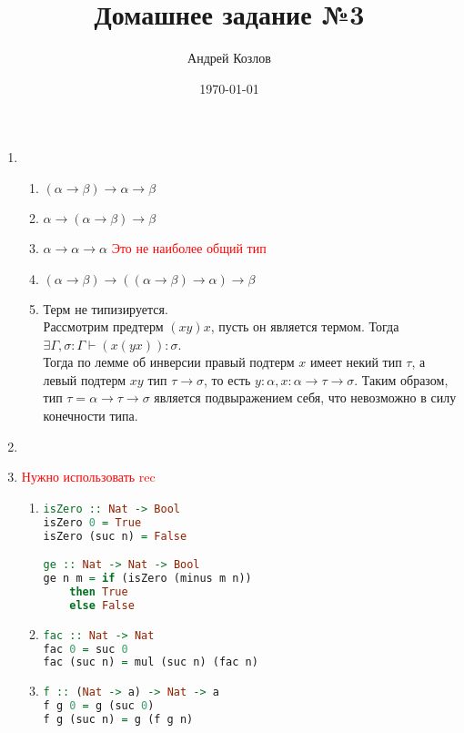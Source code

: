 \documentclass[12pt,a4paper]{article}
\begin{document}
\title{Домашнее задание №3}
\author{Андрей Козлов}
\date{\today}

\maketitle

\begin{enumerate}
\item {
	\begin{enumerate}
		\item $(\alpha \rightarrow \beta) \rightarrow \alpha \rightarrow \beta$
		\item $\alpha \rightarrow (\alpha \rightarrow \beta) \rightarrow \beta$
		\item $\alpha \rightarrow \alpha \rightarrow \alpha$
            \textcolor{red}{Это не наиболее общий тип}
		\item $(\alpha \rightarrow \beta) \rightarrow ((\alpha \rightarrow \beta) \rightarrow \alpha) \rightarrow \beta$
		\item {
			Терм не типизируется.\\
			Рассмотрим предтерм $(x y) x$, пусть он является термом. Тогда $\exists \Gamma, \sigma \colon \Gamma \vdash (x (y x)) \colon \sigma$.\\
			Тогда по лемме об инверсии правый подтерм $x$ имеет некий тип $\tau$, а левый подтерм $x y$ тип $\tau \rightarrow \sigma$, то есть $y \colon \alpha, x \colon \alpha \rightarrow \tau \rightarrow \sigma$. Таким образом, тип $\tau =  \alpha \rightarrow \tau \rightarrow \sigma$ является подвыражением себя, что невозможно в силу конечности типа.
		}
	\end{enumerate}
}
\item
\item
\textcolor{red}{Нужно использовать rec}
{
	\begin{enumerate}
		\item {
			\begin{lstlisting}[language=Haskell]
isZero :: Nat -> Bool
isZero 0 = True
isZero (suc n) = False

ge :: Nat -> Nat -> Bool
ge n m = if (isZero (minus m n))
	then True
	else False
			\end{lstlisting}
		}
		\item {
			\begin{lstlisting}[language=Haskell]
fac :: Nat -> Nat
fac 0 = suc 0
fac (suc n) = mul (suc n) (fac n)
			\end{lstlisting}
		}
		\item {
			\begin{lstlisting}[language=Haskell]
f :: (Nat -> a) -> Nat -> a
f g 0 = g (suc 0)
f g (suc n) = g (f g n)


\end{lstlisting}}
\end{enumerate}}
\end{enumerate}
\end{document}
